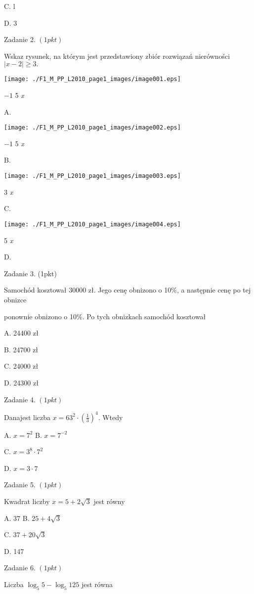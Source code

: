 \documentclass[a4paper,12pt]{article}
\begin{document}
C. l

D. 3

Zadanie 2. $(1pkt)$

Wskaz rysunek, na którym jest przedstawiony zbiór rozwiązań nierówności $|x-2|\geq 3.$
\begin{center}
\texttt{[image: ./F1\_M\_PP\_L2010\_page1\_images/image001.eps]}
\end{center}
$-1$  5  {\it x}

A.
\begin{center}
\texttt{[image: ./F1\_M\_PP\_L2010\_page1\_images/image002.eps]}
\end{center}
$-1$  5  {\it x}

B.
\begin{center}
\texttt{[image: ./F1\_M\_PP\_L2010\_page1\_images/image003.eps]}
\end{center}
3  {\it x}

C.
\begin{center}
\texttt{[image: ./F1\_M\_PP\_L2010\_page1\_images/image004.eps]}
\end{center}
5  {\it x}

D.

Zadanie 3. (1pkt)

Samochód kosztował 30000 zł. Jego cenę obnizono o 10\%, a następnie cenę po tej obnizce

ponownie obnizono o 10\%. Po tych obnizkach samochód kosztował

A. 24400 zł

B. 24700 zł

C. 24000 zł

D. 24300 zł

Zadanie 4. $(1pkt)$

Danajest liczba $x=63^{2}\displaystyle \cdot(\frac{1}{3})^{4}$. Wtedy

A. $x=7^{2}$ B. $x=7^{-2}$

C. $x=3^{8}\cdot 7^{2}$

D. $x=3\cdot 7$

Zadanie 5. $(1pkt)$

Kwadrat liczby $x=5+2\sqrt{3}$ jest równy

A. 37 B. $25+4\sqrt{3}$

C. $37+20\sqrt{3}$

D. 147

Zadanie 6. $(1pkt)$

Liczba $\log_{5}5-\log_{5}125$ jest równa
\end{document}

